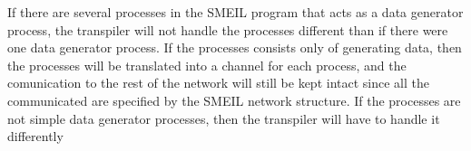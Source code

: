 If there are several processes in the SMEIL program that acts as a data generator process, the transpiler will not handle the processes different than if there were one data generator process. If the processes consists only of generating data, then the processes will be translated into a \cspm channel for each process, and the comunication to the rest of the network will still be kept intact since all the communicated are specified by the SMEIL network structure.
If the processes are not simple data generator processes, then the transpiler will have to handle it differently %





